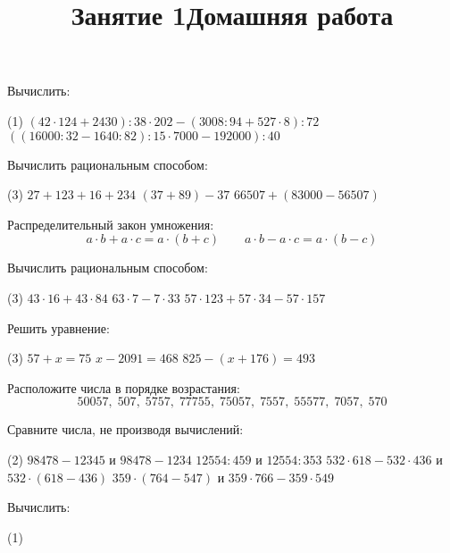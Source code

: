 %
%
%
%
\begin{class}[number=1]
	\title{Занятие 1}
	\begin{listofex}
		\item Вычислить:
		\begin{tasks}(1)
			\task \( (42\cdot124+2430):38\cdot202-(3008:94+527\cdot8):72 \)
			\task \( \left( \left( 16000:32 - 1640:82 \right):15\cdot7000 - 192000 \right):40 \)
		\end{tasks}
		\item Вычислить рациональным способом:
		\begin{tasks}(3)
			\task \( 27+123+16+234 \)
			\task \( (37+89)-37 \)
			\task \( 66507+(83000-56507) \)
		\end{tasks}
	\end{listofex}
	\begin{definit}
		Распределительный закон умножения:
		\[
		a\cdot b + a\cdot c = a\cdot(b+c)
		\qquad
		a \cdot b - a \cdot c = a\cdot(b-c)\]
	\end{definit}
	\begin{listofex}[resume]
		\item Вычислить рациональным способом:
		\begin{tasks}(3)
			\task \( 43\cdot16+43\cdot84 \)
			\task \( 63\cdot7-7\cdot33 \)
			\task \( 57\cdot123+57\cdot34-57\cdot157 \)
		\end{tasks}
		\item Решить уравнение:
		\begin{tasks}(3)
			\task \( 57+x=75 \)
			\task \( x-2091=468 \)
			\task \( 825-(x+176)=493 \)
		\end{tasks}
		\item Расположите числа в порядке возрастания:
		\[ 50057,\;507,\;5757,\;77755,\;75057,\;7557,\;55577,\;7057,\;570 \]
		\item Сравните числа, не производя вычислений:
		\begin{tasks}(2)
			\task \( 98478-12345 \) и \( 98478-1234 \)
			\task \( 12554:459 \) и \( 12554:353 \)
			\task \( 532\cdot618-532\cdot436 \) и \( 532\cdot(618-436) \)
			\task \( 359\cdot(764-547) \) и \( 359\cdot766-359\cdot549 \)
		\end{tasks}
	\end{listofex}
	\newpage
	\title{Домашняя работа}
	\begin{listofex}
		\item Вычислить:
		\begin{tasks}(1)

\end{tasks}
\end{listofex}
\end{class}

